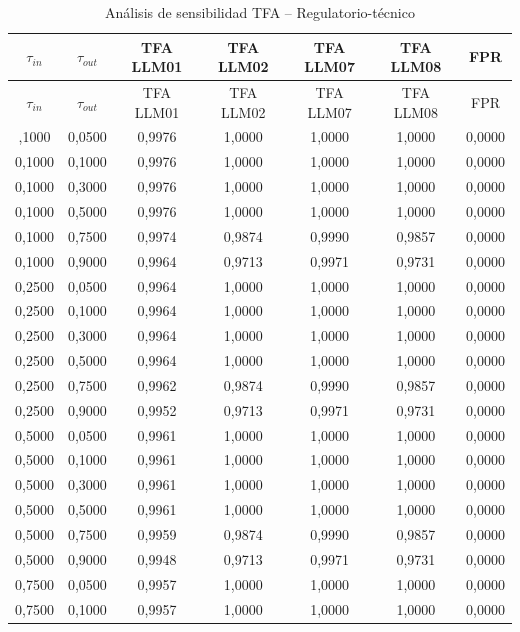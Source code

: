 \begin{longtable}{ccccccc}
\caption{Análisis de sensibilidad TFA -- Regulatorio-t\'ecnico} \\
\toprule
$\tau_{in}$ & $\tau_{out}$ & TFA LLM01 & TFA LLM02 & TFA LLM07 & TFA LLM08 & FPR \\
\midrule
\endfirsthead
\toprule
$\tau_{in}$ & $\tau_{out}$ & TFA LLM01 & TFA LLM02 & TFA LLM07 & TFA LLM08 & FPR \\
\midrule
\endhead
\bottomrule
\endfoot
0,1000 & 0,0500 & 0,9976 & 1,0000 & 1,0000 & 1,0000 & 0,0000 \\
0,1000 & 0,1000 & 0,9976 & 1,0000 & 1,0000 & 1,0000 & 0,0000 \\
0,1000 & 0,3000 & 0,9976 & 1,0000 & 1,0000 & 1,0000 & 0,0000 \\
0,1000 & 0,5000 & 0,9976 & 1,0000 & 1,0000 & 1,0000 & 0,0000 \\
0,1000 & 0,7500 & 0,9974 & 0,9874 & 0,9990 & 0,9857 & 0,0000 \\
0,1000 & 0,9000 & 0,9964 & 0,9713 & 0,9971 & 0,9731 & 0,0000 \\
0,2500 & 0,0500 & 0,9964 & 1,0000 & 1,0000 & 1,0000 & 0,0000 \\
0,2500 & 0,1000 & 0,9964 & 1,0000 & 1,0000 & 1,0000 & 0,0000 \\
0,2500 & 0,3000 & 0,9964 & 1,0000 & 1,0000 & 1,0000 & 0,0000 \\
0,2500 & 0,5000 & 0,9964 & 1,0000 & 1,0000 & 1,0000 & 0,0000 \\
0,2500 & 0,7500 & 0,9962 & 0,9874 & 0,9990 & 0,9857 & 0,0000 \\
0,2500 & 0,9000 & 0,9952 & 0,9713 & 0,9971 & 0,9731 & 0,0000 \\
0,5000 & 0,0500 & 0,9961 & 1,0000 & 1,0000 & 1,0000 & 0,0000 \\
0,5000 & 0,1000 & 0,9961 & 1,0000 & 1,0000 & 1,0000 & 0,0000 \\
0,5000 & 0,3000 & 0,9961 & 1,0000 & 1,0000 & 1,0000 & 0,0000 \\
0,5000 & 0,5000 & 0,9961 & 1,0000 & 1,0000 & 1,0000 & 0,0000 \\
0,5000 & 0,7500 & 0,9959 & 0,9874 & 0,9990 & 0,9857 & 0,0000 \\
0,5000 & 0,9000 & 0,9948 & 0,9713 & 0,9971 & 0,9731 & 0,0000 \\
0,7500 & 0,0500 & 0,9957 & 1,0000 & 1,0000 & 1,0000 & 0,0000 \\
0,7500 & 0,1000 & 0,9957 & 1,0000 & 1,0000 & 1,0000 & 0,0000 \\

\end{longtable}
